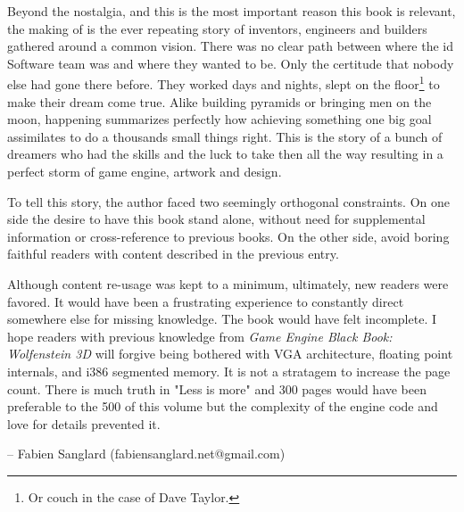 Beyond the nostalgia, and this is the most important reason this book is relevant, the making of \doom is the ever repeating story of inventors, engineers and builders gathered around a common vision. There was no clear path between where the id Software team was and where they wanted to be. Only the certitude that nobody else had gone there before. They worked days and nights, slept on the floor\footnote{Or couch in the case of Dave Taylor.} to make their dream come true. Alike building pyramids or bringing men on the moon, \doom happening summarizes perfectly how achieving something one big goal assimilates to do a thousands small things right. This is the story of a bunch of dreamers who had the skills and the luck to take then all the way resulting in a perfect storm of game engine, artwork and design.\\
\par
 To tell this story, the author faced two seemingly orthogonal constraints. On one side the desire to have this book stand alone, without need for supplemental information or cross-reference to previous books. On the other side, avoid boring faithful readers with content described in the previous entry.\\
\par
Although content re-usage was kept to a minimum, ultimately, new readers were favored. It would have been a frustrating experience to constantly direct somewhere else for missing knowledge. The book would have felt incomplete. I hope readers with previous knowledge from \textit{Game Engine Black Book: Wolfenstein 3D} will forgive being bothered with VGA architecture, floating point internals, and i386 segmented memory. It is not a stratagem to increase the page count. There is much truth in "Less is more" and 300 pages would have been preferable to the 500 of this volume but the complexity of the engine code and love for details prevented it.\\
\par
-- Fabien Sanglard (fabiensanglard.net@gmail.com)